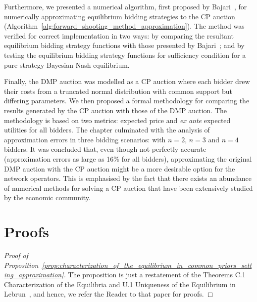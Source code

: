 Furthermore, we presented a numerical algorithm, first proposed by Bajari~\cite{Bajari2001a}, for numerically approximating equilibrium bidding strategies to the CP auction (Algorithm~\ref{alg:forward_shooting_method_approximation}). The method was verified for correct implementation in two ways: by comparing the resultant equilibrium bidding strategy functions with those presented by Bajari~\cite{Bajari2001a}; and by testing the equilibrium bidding strategy functions for sufficiency condition for a pure strategy Bayesian Nash equilibrium.

Finally, the DMP auction was modelled as a CP auction where each bidder drew their costs from a truncated normal distribution with common support but differing parameters. We then proposed a formal methodology for comparing the results generated by the CP auction with those of the DMP auction. The methodology is based on two metrics: expected price and \emph{ex ante} expected utilities for all bidders. The chapter culminated with the analysis of approximation errors in three bidding scenarios: with $n=2$, $n=3$ and $n=4$ bidders. It was concluded that, even though not perfectly accurate (approximation errors as large as 16\% for all bidders), approximating the original DMP auction with the CP auction might be a more desirable option for the network operators. This is emphasised by the fact that there exists an abundance of numerical methods for solving a CP auction that have been extensively studied by the economic community.

\section{Proofs} %
\label{sec:proofs_approximation}
\begin{proof}[Proof of Proposition~\ref{prop:characterization_of_the_equilibrium_in_common_priors_setting_approximation}]
The proposition is just a restatement of the Theorems C.1 Characterization of the Equilibria and U.1 Uniqueness of the Equilibrium in Lebrun~\cite{Lebrun2006}, and hence, we refer the Reader to that paper for proofs.
\end{proof}
